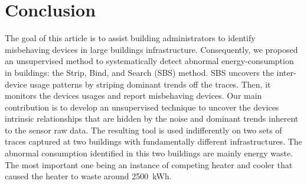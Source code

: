 \section{Conclusion}
The goal of this article is to assist building administrators to identify misbehaving devices in large buildings infrastructure.
Consequently, we proposed an unsupervised method to systematically detect abnormal energy-consumption in buildings: the Strip, Bind, and Search (SBS) method.
SBS uncovers the inter-device usage patterns by striping dominant trends off the traces.
Then, it monitors the devices usages and report misbehaving devices.
Our main contribution is to develop an unsupervised technique to uncover the devices intrinsic relationships that are hidden by the noise and dominant trends inherent to the sensor raw data.
The resulting tool is used indifferently on two sets of traces captured at two buildings with fundamentally different infrastructures.
The abnormal consumption identified in this two buildings are mainly energy waste.
The most important one being an instance of competing heater and cooler that caused the heater to waste around 2500~kWh.



